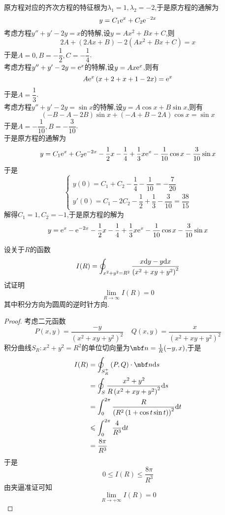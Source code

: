\documentclass{ctexart}
\begin{document}
\begin{solution}
    原方程对应的齐次方程的特征根为$\lambda_1=1,\lambda_2=-2$,于是原方程的通解为
    \[y=C_1\mathrm{e}^{x}+C_2\mathrm{e}^{-2x}\]
    考虑方程$y''+y'-2y=x$的特解,设$y=Ax^2+Bx+C$,则
    \[2A+(2Ax+B)-2\left(Ax^2+Bx+C\right)=x\]
    于是$A=0,B=-\dfrac12,C=-\dfrac14$.\\
    考虑方程$y''+y'-2y=\mathrm{e}^x$的特解,设$y=Ax\mathrm{e}^x$,则有
    \[A\mathrm{e}^x\left(x+2+x+1-2x\right)=\mathrm{e}^x\]
    于是$A=\dfrac13$.\\
    考虑方程$y''+y'-2y=\sin x$的特解,设$y=A\cos x+B\sin x$,则有
    \[(-B-A-2B)\sin x+(-A+B-2A)\cos x=\sin x\]
    于是$A=-\dfrac{1}{10},B=-\dfrac{3}{10}$.\\
    于是原方程的通解为
    \[y=C_1\mathrm{e}^{x}+C_2\mathrm{e}^{-2x}-\dfrac12x-\dfrac14+\dfrac13x\mathrm{e}^x-\dfrac{1}{10}\cos x-\dfrac{3}{10}\sin x\]
    于是
    \[\left\{\begin{array}{l}
        y(0)=C_1+C_2-\dfrac14-\dfrac{1}{10}=-\dfrac{7}{20}\\
        y'(0)=C_1-2C_2-\dfrac12+\dfrac{1}{3}-\dfrac{3}{10}=\dfrac{38}{15}
    \end{array}\right.\]
    解得$C_1=1,C_2=-1$,于是原方程的解为
    \[y=\mathrm{e}^{x}-\mathrm{e}^{-2x}-\dfrac12x-\dfrac14+\dfrac13x\mathrm{e}^x-\dfrac{1}{10}\cos x-\dfrac{3}{10}\sin x\]

\end{solution}
\begin{problem}[4.(10\songti{分})]
    设关于$R$的函数
    \[I(R)=\oint_{x^2+y^2=R^2}\dfrac{x\mathrm{d} y-y\mathrm{d} x}{\left(x^2+xy+y^2\right)^2}\]
    试证明
    \[\lim_{R\to\infty}I(R)=0\]
    其中积分方向为圆周的逆时针方向.
\end{problem}
\begin{proof}
    考虑二元函数
    \[P(x,y)=\dfrac{-y}{\left(x^2+xy+y^2\right)^2}\ \ \ \ \ Q(x,y)=\dfrac{x}{\left(x^2+xy+y^2\right)^2}\]
    积分曲线$S_R:x^2+y^2=R^2$的单位切向量为$\mbf n=\frac{1}{R}(-y,x)$,于是
    \[\begin{aligned}
        I(R)
        &= \oint_{S_R^+}\left(P,Q\right)\cdot\mbf n\di s \\
        &= \oint_S\dfrac{x^2+y^2}{R\left(x^2+xy+y^2\right)^2}\di s \\
        &= \int_0^{2\pi}\dfrac{R}{\left(R^2\left(1+\cos t\sin t\right)\right)^2}\di t \\
        &\leqslant \int_0^{2\pi}\dfrac{4}{R^3}\di t \\
        &= \dfrac{8\pi}{R^3}
    \end{aligned}\]
    于是
    \[0\leqslant I(R)\leqslant \dfrac{8\pi}{R^3}\]
    由夹逼准证可知
    \[\lim_{R\to+\infty}I(R)=0\]

\end{proof}
\end{document}
